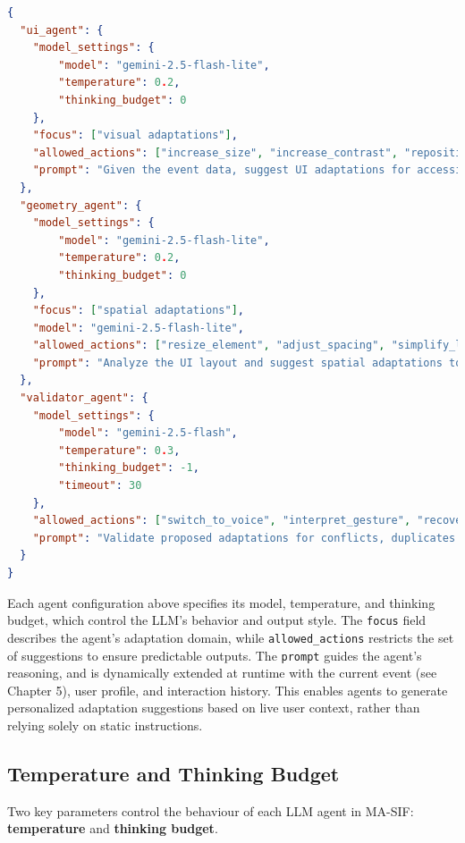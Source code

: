 \documentclass[openany]{book}
\begin{document}
\begin{lstlisting}[language=json,firstnumber=1, caption={Basic example of a 2-agent (+ validator) configuration}]
{
  "ui_agent": {
    "model_settings": {
        "model": "gemini-2.5-flash-lite",
        "temperature": 0.2,
        "thinking_budget": 0
    },
    "focus": ["visual adaptations"],
    "allowed_actions": ["increase_size", "increase_contrast", "reposition_element"],
    "prompt": "Given the event data, suggest UI adaptations for accessibility. Consider user profile and interaction history."
  },
  "geometry_agent": {
    "model_settings": {
        "model": "gemini-2.5-flash-lite",
        "temperature": 0.2,
        "thinking_budget": 0
    },
    "focus": ["spatial adaptations"],
    "model": "gemini-2.5-flash-lite",
    "allowed_actions": ["resize_element", "adjust_spacing", "simplify_layout"],
    "prompt": "Analyze the UI layout and suggest spatial adaptations to improve usability for motor-impaired users."
  },
  "validator_agent": {
    "model_settings": {
        "model": "gemini-2.5-flash",
        "temperature": 0.3,
        "thinking_budget": -1,
        "timeout": 30
    },
    "allowed_actions": ["switch_to_voice", "interpret_gesture", "recover_from_error", "increase_size", "increase_contrast", "reposition_element","resize_element", "adjust_spacing", "simplify_layout"],
    "prompt": "Validate proposed adaptations for conflicts, duplicates and inconsistencies based on user context, events and interaction history."
  }
}
\end{lstlisting}
Each agent configuration above specifies its model, temperature, and thinking budget, which control the LLM's behavior and output style. The \texttt{focus} field describes the agent's adaptation domain, while \texttt{allowed\_actions} restricts the set of suggestions to ensure predictable outputs. The \texttt{prompt} guides the agent's reasoning, and is dynamically extended at runtime with the current event (see Chapter 5), user profile, and interaction history. This enables agents to generate personalized adaptation suggestions based on live user context, rather than relying solely on static instructions.

\subsection{Temperature and Thinking Budget}

Two key parameters control the behaviour of each LLM agent in MA-SIF: \textbf{temperature} and \textbf{thinking budget}.
\end{document}
